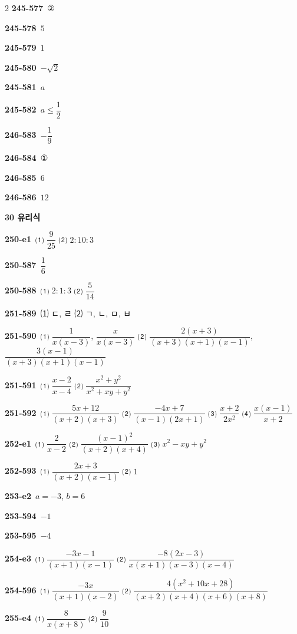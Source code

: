 \documentclass[10pt,a4paper]{article}
\begin{document}
\begin{multicols}{2}
\noindent\textbf{245-577}\ ②\par
\noindent\textbf{245-578}\ $5$\par
\noindent\textbf{245-579}\ $1$\par
\noindent\textbf{245-580}\ $-\sqrt{2}$\par
\noindent\textbf{245-581}\ $a$\par
\noindent\textbf{245-582}\ $a\le\dfrac{1}{2}$\par
\noindent\textbf{246-583}\ $-\dfrac{1}{9}$\par
\noindent\textbf{246-584}\ ①\par
\noindent\textbf{246-585}\ $6$\par
\noindent\textbf{246-586}\ $12$\par
\noindent\textbf{30 유리식}\par\smallskip
\noindent\textbf{250-e1}\ ⑴ $\dfrac{9}{25}$ ⑵ $2:10:3$\par
\noindent\textbf{250-587}\ $\dfrac{1}{6}$\par
\noindent\textbf{250-588}\ ⑴ $2:1:3$ ⑵ $\dfrac{5}{14}$\par
\noindent\textbf{251-589}\ ⑴ ㄷ, ㄹ ⑵ ㄱ, ㄴ, ㅁ, ㅂ\par
\noindent\textbf{251-590}\ ⑴ $\dfrac{1}{x(x-3)}$, $\dfrac{x}{x(x-3)}$ ⑵ $\dfrac{2(x+3)}{(x+3)(x+1)(x-1)}$, $\dfrac{3(x-1)}{(x+3)(x+1)(x-1)}$\par
\noindent\textbf{251-591}\ ⑴ $\dfrac{x-2}{x-4}$ ⑵ $\dfrac{x^2+y^2}{x^2+xy+y^2}$\par
\noindent\textbf{251-592}\ ⑴ $\dfrac{5x+12}{(x+2)(x+3)}$ ⑵ $\dfrac{-4x+7}{(x-1)(2x+1)}$ ⑶ $\dfrac{x+2}{2x^2}$ ⑷ $\dfrac{x(x-1)}{x+2}$\par
\noindent\textbf{252-e1}\ ⑴ $\dfrac{2}{x-2}$ ⑵ $\dfrac{(x-1)^2}{(x+2)(x+4)}$ ⑶ $x^2-xy+y^2$\par
\noindent\textbf{252-593}\ ⑴ $\dfrac{2x+3}{(x+2)(x-1)}$ ⑵ $1$\par
\noindent\textbf{253-e2}\ $a=-3$, $b=6$\par
\noindent\textbf{253-594}\ $-1$\par
\noindent\textbf{253-595}\ $-4$\par
\noindent\textbf{254-e3}\ ⑴ $\dfrac{-3x-1}{(x+1)(x-1)}$ ⑵ $\dfrac{-8(2x-3)}{x(x+1)(x-3)(x-4)}$\par
\noindent\textbf{254-596}\ ⑴ $\dfrac{-3x}{(x+1)(x-2)}$ ⑵ $\dfrac{4(x^2+10x+28)}{(x+2)(x+4)(x+6)(x+8)}$\par
\noindent\textbf{255-e4}\ ⑴ $\dfrac{8}{x(x+8)}$ ⑵ $\dfrac{9}{10}$\par

\end{multicols}
\end{document}
